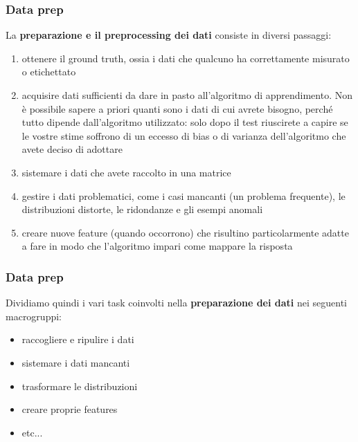\begin{frame}
	
	\frametitle{Data prep}
	
	La \textbf{preparazione e il preprocessing dei dati} consiste in diversi passaggi:
	\begin{enumerate}
		\item ottenere il ground truth, ossia i dati che qualcuno ha correttamente misurato o etichettato
		\item acquisire dati sufficienti da dare in pasto all'algoritmo di apprendimento. Non è possibile sapere a priori quanti sono i dati di cui avrete bisogno, perché tutto dipende dall'algoritmo utilizzato: solo dopo il test riuscirete a capire se le vostre stime soffrono di un eccesso di bias o di varianza dell'algoritmo che avete deciso di adottare
		\item sistemare i dati che avete raccolto in una matrice
		\item gestire i dati problematici, come i casi mancanti (un problema frequente), le distribuzioni distorte, le ridondanze e gli esempi anomali
		\item creare nuove feature (quando occorrono) che risultino particolarmente adatte a fare in modo che l'algoritmo impari come mappare la risposta
	\end{enumerate}
			

\end{frame}


\begin{frame}
	
	\frametitle{Data prep}
	
		Dividiamo quindi i vari task coinvolti nella \textbf{preparazione dei dati} nei seguenti macrogruppi:\\
		\begin{itemize}
			\item {\color{GradientDescentDiagramBlue}raccogliere e ripulire i dati}
			\item {\color{GradientDescentDiagramGreen}sistemare i dati mancanti}
			\item {\color{GradientDescentDiagramOrange}trasformare le distribuzioni}
			\item {\color{GradientDescentDiagramRed}creare proprie features}
			\item etc...
		\end{itemize}		

\end{frame}